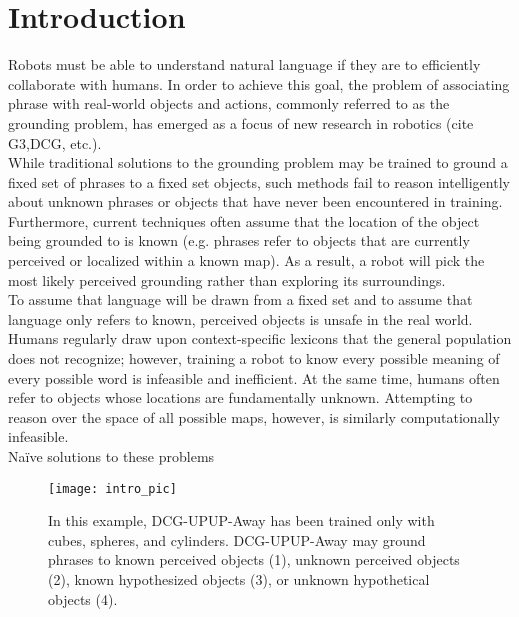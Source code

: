 \section{Introduction}
Robots must be able to understand natural language if they are to efficiently collaborate with humans.
In order to achieve this goal, the problem of associating phrase with real-world objects and actions, commonly referred to as the grounding problem, has emerged as a focus of new research in robotics (cite G3,DCG, etc.).\\
\indent While traditional solutions to the grounding problem may be trained to ground a fixed set of phrases to a fixed set objects, such methods fail to reason intelligently about unknown phrases or objects that have never been encountered in training.
Furthermore, current techniques often assume that the location of the object being grounded to is known (e.g. phrases refer to objects that are currently perceived or localized within a known map).
As a result, a robot will pick the most likely perceived grounding rather than exploring its surroundings.\\
\indent To assume that language will be drawn from a fixed set and to assume that language only refers to known, perceived objects is unsafe in the real world.
Humans regularly draw upon context-specific lexicons that the general population does not recognize; however, training a robot to know every possible meaning of every possible word is infeasible and inefficient.
At the same time, humans often refer to objects whose locations are fundamentally unknown.
Attempting to reason over the space of all possible maps, however, is similarly computationally infeasible.\\
\indent Na{\"i}ve solutions to these problems 
\begin{figure}[t]
	\centering
	\texttt{[image: intro\_pic]}
	\caption{In this example, DCG-UPUP-Away has been trained only with cubes, spheres, and cylinders. DCG-UPUP-Away may ground phrases to known perceived objects (1), unknown perceived objects (2), known hypothesized objects (3), or unknown hypothetical objects (4).}
	\label{fig:intro_pic}
\end{figure}